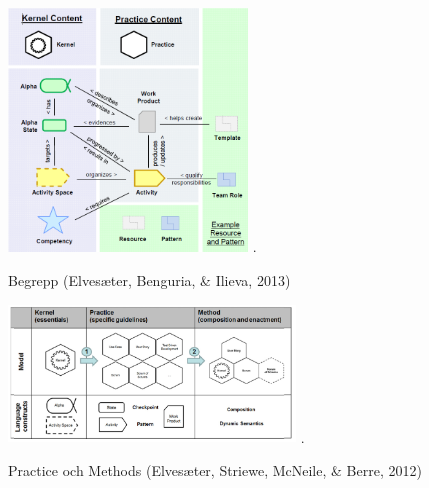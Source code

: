 \documentclass[conference,a4paper]{IEEEtran}
\begin{document}
\begin{figure}[H]
\centering
\includegraphics[width=2.5in]{essencebegrepp}
\DeclareGraphicsExtensions.
\caption{Begrepp (Elves{\ae}ter, Benguria, \& Ilieva, 2013)}
\label{begrepp}
\end{figure}

\begin{figure}[H]
\centering
\includegraphics[width=3in]{practice}
\DeclareGraphicsExtensions.
\caption{Practice och Methods (Elves{\ae}ter, Striewe, McNeile, \& Berre, 2012)}
\label{practice}
\end{figure}
\end{document}

